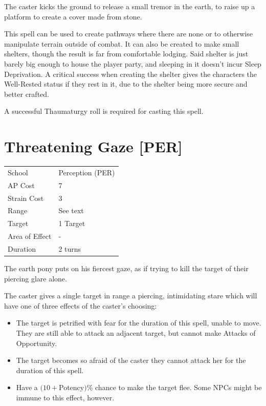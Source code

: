 \documentclass[11pt,a4paper,twocolumn]{book}
\begin{document}
\medskip

The caster kicks the ground to release a small tremor in the earth, to raise up a platform to create a cover made from stone.

This spell can be used to create pathways where there are none or to otherwise manipulate terrain outside of combat.
It can also be created to make small shelters, though the result is far from comfortable lodging. Said shelter is just barely big enough to house the player party, and sleeping in it doesn't incur Sleep Deprivation. A critical success when creating the shelter gives the characters the Well-Rested status if they rest in it, due to the shelter being more secure and better crafted.

A successful Thaumaturgy roll is required for casting this spell.

\section*{Threatening Gaze [PER]}
{
	\begin{tabu} to 75mm{| X[l,4] | X[l,7] |}
		\hline
		School 			& Perception (PER) 	\\
		AP Cost	      	& 7 				\\
		Strain Cost     & 3 				\\
		Range     		& See text 	\\
		Target      	& 1 Target				\\
		Area of Effect  & - 	 		\\
		Duration     	& 2 turns 				\\ \hline
	\end{tabu}
	
}

\medskip

The earth pony puts on his fiercest gaze, as if trying to kill the target of their piercing glare alone.

The caster gives a single target in range a piercing, intimidating stare which will have one of three effects of the caster's choosing:

\begin{itemize}
	\item The target is petrified with fear for the duration of this spell, unable to move. They are still able to attack an adjacent target, but cannot make Attacks of Opportunity.
	\item The target becomes so afraid of the caster they cannot attack her for the duration of this spell.
	\item Have a $(10 + $Potency$)\%$ chance to make the target flee. Some NPCs might be immune to this effect, however.
\end{itemize}
\end{document}
